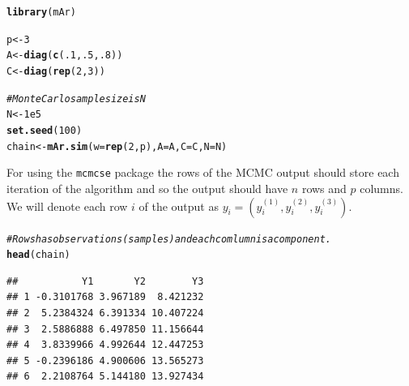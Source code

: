 \documentclass[11pt]{article}\usepackage[]{graphicx}\usepackage[]{color}
\makeatletter
\newcommand{\hlnum}[1]{\textcolor[rgb]{0.686,0.059,0.569}{#1}}%
\newcommand{\hlcom}[1]{\textcolor[rgb]{0.678,0.584,0.686}{\textit{#1}}}%
\newcommand{\hlstd}[1]{\textcolor[rgb]{0.345,0.345,0.345}{#1}}%
\newcommand{\hlkwb}[1]{\textcolor[rgb]{0.69,0.353,0.396}{#1}}%
\newcommand{\hlkwc}[1]{\textcolor[rgb]{0.333,0.667,0.333}{#1}}%
\newcommand{\hlkwd}[1]{\textcolor[rgb]{0.737,0.353,0.396}{\textbf{#1}}}%
\newenvironment{kframe}{%
 \def\at@end@of@kframe{}%
 \ifinner\ifhmode%
  \def\at@end@of@kframe{\end{minipage}}%
  \begin{minipage}{\columnwidth}%
 \fi\fi%
 \def\FrameCommand##1{\hskip\@totalleftmargin \hskip-\fboxsep
 \colorbox{shadecolor}{##1}\hskip-\fboxsep
     \hskip-\linewidth \hskip-\@totalleftmargin \hskip\columnwidth}%
 \MakeFramed {\advance\hsize-\width
   \@totalleftmargin\z@ \linewidth\hsize
   \@setminipage}}%
 {\par\unskip\endMakeFramed%
 \at@end@of@kframe}
\newenvironment{knitrout}{}{} %
\makeatother
\begin{document}
\begin{knitrout}
\color{fgcolor}\begin{kframe}
\begin{alltt}
\hlkwd{library}\hlstd{(mAr)}
\end{alltt}


{\ttfamily\noindent\itshape\color{messagecolor}{\#\# Loading required package: MASS}}\begin{alltt}
\hlstd{p} \hlkwb{<-} \hlnum{3}
\hlstd{A} \hlkwb{<-} \hlkwd{diag}\hlstd{(}\hlkwd{c}\hlstd{(}\hlnum{.1}\hlstd{,} \hlnum{.5}\hlstd{,} \hlnum{.8}\hlstd{))}
\hlstd{C} \hlkwb{<-} \hlkwd{diag}\hlstd{(}\hlkwd{rep}\hlstd{(}\hlnum{2}\hlstd{,} \hlnum{3}\hlstd{))}

\hlcom{# Monte Carlo sample size is N}
\hlstd{N} \hlkwb{<-} \hlnum{1e5}
\hlkwd{set.seed}\hlstd{(}\hlnum{100}\hlstd{)}
\hlstd{chain} \hlkwb{<-} \hlkwd{mAr.sim}\hlstd{(}\hlkwc{w} \hlstd{=} \hlkwd{rep}\hlstd{(}\hlnum{2}\hlstd{,p),} \hlkwc{A} \hlstd{= A,} \hlkwc{C} \hlstd{= C,} \hlkwc{N} \hlstd{= N)}
\end{alltt}
\end{kframe}
\end{knitrout}

For using the \texttt{mcmcse} package the rows of the MCMC output should store each iteration of the algorithm and so the output should have $n$ rows and $p$ columns. We will denote each row $i$ of the output as $y_i = (y^{(1)}_i, y^{(2)}_i, y^{(3)}_i)$.

\begin{knitrout}
\color{fgcolor}\begin{kframe}
\begin{alltt}
\hlcom{#Rows has observations (samples) and each comlumn is a component. }
\hlkwd{head}\hlstd{(chain)}
\end{alltt}
\begin{verbatim}
##           Y1       Y2        Y3
## 1 -0.3101768 3.967189  8.421232
## 2  5.2384324 6.391334 10.407224
## 3  2.5886888 6.497850 11.156644
## 4  3.8339966 4.992644 12.447253
## 5 -0.2396186 4.900606 13.565273
## 6  2.2108764 5.144180 13.927434
\end{verbatim}
\end{kframe}
\end{knitrout}
\end{document}
